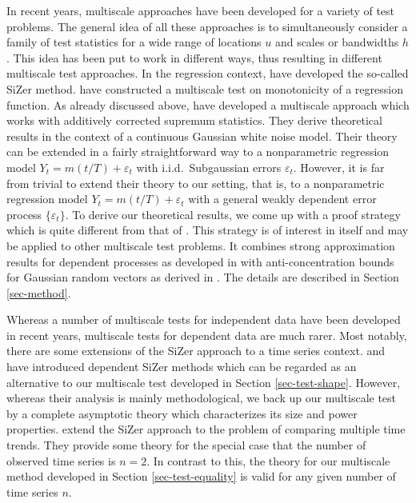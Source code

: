 In recent years, multiscale approaches have been developed for a variety of test problems. The general idea of all these approaches is to simultaneously consider a family of test statistics for a wide range of locations $u$ and scales or bandwidths $h$. This idea has been put to work in different ways, thus resulting in different multiscale test approaches. In the regression context, \cite{ChaudhuriMarron1999,ChaudhuriMarron2000} have developed the so-called SiZer method. 
\cite{HallHeckman2000} have constructed a multiscale test on monotonicity of a regression function. As already discussed above, \cite{DuembgenSpokoiny2001} have developed a multiscale approach which works with additively corrected supremum statistics. They derive theoretical results in the context of  a continuous Gaussian white noise model. Their theory can be extended in a fairly straightforward way to a nonparametric regression model $Y_t = m(t/T) + \varepsilon_t$ with i.i.d.\ Subgaussian errors $\varepsilon_t$. However, it is far from trivial to extend their theory to our setting, that is, to a nonparametric regression model $Y_t = m(t/T) + \varepsilon_t$ with a general weakly dependent error process $\{\varepsilon_t\}$. To derive our theoretical results, we come up with a proof strategy which is quite different from that of \cite{DuembgenSpokoiny2001}. This strategy is of interest in itself and may be applied to other multiscale test problems. It combines strong approximation results for dependent processes as developed in \cite{BerkesLiuWu2014} with anti-concentration bounds for Gaussian random vectors as derived in \cite{Chernozhukov2015}. The details are described in Section \ref{sec-method}.


\newpage
Whereas a number of multiscale tests for independent data have been developed in recent years, multiscale tests for dependent data are much rarer. Most notably, there are some extensions of the SiZer approach to a time series context. \cite{Rondonotti2004} and \cite{Rondonotti2007} have introduced dependent SiZer methods which can be regarded as an alternative to our multiscale test developed in Section \ref{sec-test-shape}. However, whereas their analysis is mainly methodological, we back up our multiscale test by a complete asymptotic theory which characterizes its size and power properties. \cite{Park2009} extend the SiZer approach to the problem of comparing multiple time trends. They provide some theory for the special case that the number of observed time series is $n=2$. In contrast to this, the theory for our multiscale method developed in Section \ref{sec-test-equality} is valid for any given number of time series $n$.


